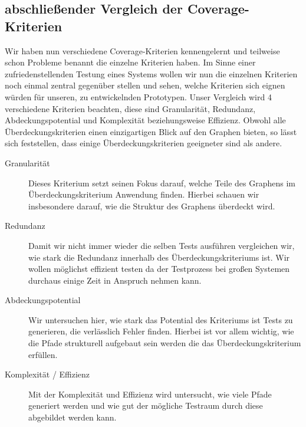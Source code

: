 \subsection{abschließender Vergleich der Coverage-Kriterien}

Wir haben nun verschiedene Coverage-Kriterien kennengelernt und teilweise schon Probleme benannt die einzelne
Kriterien haben.
Im Sinne einer zufriedenstellenden Testung eines Systems wollen wir nun die einzelnen Kriterien noch einmal
zentral gegenüber stellen und sehen, welche Kriterien sich eignen würden für unseren, zu entwickelnden Prototypen.
Unser Vergleich wird 4 verschiedene Kriterien beachten, diese sind Granularität, Redundanz, Abdeckungspotential und Komplexität beziehungsweise Effizienz.
Obwohl alle Überdeckungskriterien einen einzigartigen Blick auf den Graphen bieten, so lässt sich feststellen, dass
einige Überdeckungskriterien geeigneter sind als andere.

\begin{description}
    \item[Granularität] Dieses Kriterium setzt seinen Fokus darauf, welche Teile des Graphens im Überdeckungskriterium Anwendung finden.
    Hierbei schauen wir insbesondere darauf, wie die Struktur des Graphens überdeckt wird.

    \item[Redundanz] Damit wir nicht immer wieder die selben Tests ausführen vergleichen wir, wie stark die Redundanz innerhalb
    des Überdeckungskriteriums ist. Wir wollen möglichst effizient testen da der Testprozess bei großen Systemen
    durchaus einige Zeit in Anspruch nehmen kann.
    \item[Abdeckungspotential] Wir untersuchen hier, wie stark das Potential des Kriteriums ist Tests zu generieren, die verlässlich Fehler finden.
    Hierbei ist vor allem wichtig, wie die Pfade strukturell aufgebaut sein werden die das Überdeckungskriterium erfüllen.

    \item[Komplexität / Effizienz] Mit der Komplexität und Effizienz wird untersucht, wie viele Pfade generiert werden und wie gut der mögliche Testraum durch diese
    abgebildet werden kann.
\end{description}

